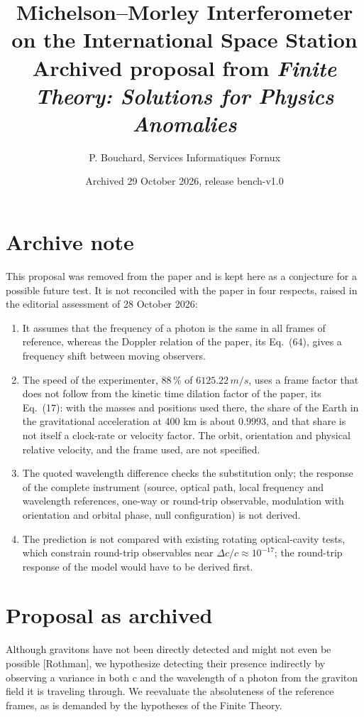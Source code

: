 \documentclass[11pt]{article}
\title{Michelson--Morley Interferometer on the International Space Station\\[2pt]\large Archived proposal from \emph{Finite Theory: Solutions for Physics Anomalies}}
\author{P. Bouchard, Services Informatiques Fornux}
\date{Archived 29 October 2026, release bench-v1.0}
\begin{document}
\maketitle
\section*{Archive note}
This proposal was removed from the paper and is kept here as a conjecture for a possible future test. It is not reconciled with the paper in four respects, raised in the editorial assessment of 28 October 2026:
\begin{enumerate}
\item It assumes that the frequency of a photon is the same in all frames of reference, whereas the Doppler relation of the paper, its Eq.~(64), gives a frequency shift between moving observers.
\item The speed of the experimenter, $88\,\%$ of $6125.22\,m/s$, uses a frame factor that does not follow from the kinetic time dilation factor of the paper, its Eq.~(17): with the masses and positions used there, the share of the Earth in the gravitational acceleration at 400 km is about $0.9993$, and that share is not itself a clock-rate or velocity factor. The orbit, orientation and physical relative velocity, and the frame used, are not specified.
\item The quoted wavelength difference checks the substitution only; the response of the complete instrument (source, optical path, local frequency and wavelength references, one-way or round-trip observable, modulation with orientation and orbital phase, null configuration) is not derived.
\item The prediction is not compared with existing rotating optical-cavity tests, which constrain round-trip observables near $\Delta c/c \approx 10^{-17}$; the round-trip response of the model would have to be derived first.
\end{enumerate}
\section*{Proposal as archived}





Although gravitons have not been directly detected and might not
even be possible [Rothman], we hypothesize detecting their
presence indirectly by observing a variance in both c and the
wavelength of a photon from the graviton field it is traveling
through. We reevaluate the absoluteness of the reference frames,
as is demanded by the hypotheses of the Finite Theory. 
\end{document}
